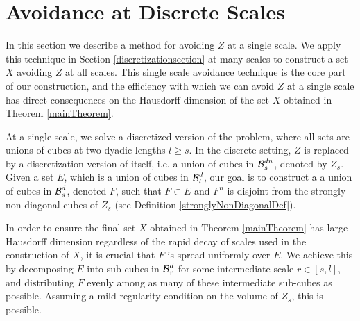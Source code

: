 \section{Avoidance at Discrete Scales}\label{discretesection}

In this section we describe a method for avoiding $Z$ at a single scale. We apply this technique in Section \ref{discretizationsection} at many scales to construct a set $X$ avoiding $Z$ at all scales. This single scale avoidance technique is the core part of our construction, and the efficiency with which we can avoid $Z$ at a single scale has direct consequences on the Hausdorff dimension of the set $X$ obtained in Theorem \ref{mainTheorem}.

At a single scale, we solve a discretized version of the problem, where all sets are unions of cubes at two dyadic lengths $l \geq s$. In the discrete setting, $Z$ is replaced by a discretization version of itself, i.e. a union of cubes in $\operatorname{\mathcal{B}}^{dn}_s$, denoted by $Z_s$. Given a set $E$, which is a union of cubes in $\operatorname{\mathcal{B}}_l^d$, our goal is to construct a a union of cubes in $\operatorname{\mathcal{B}}_s^d$, denoted $F$, such that $F \subset E$ and $F^n$ is disjoint from the strongly non-diagonal cubes of $Z_s$ (see Definition \ref{stronglyNonDiagonalDef}).


In order to ensure the final set $X$ obtained in Theorem \ref{mainTheorem} has large Hausdorff dimension regardless of the rapid decay of scales used in the construction of $X$, it is crucial that $F$ is spread uniformly over $E$. We achieve this by decomposing $E$ into sub-cubes in $\operatorname{\mathcal{B}}_r^d$ for some intermediate scale $r \in [s,l]$, and distributing $F$ evenly among as many of these intermediate sub-cubes as possible. Assuming a mild regularity condition on the volume of $Z_s$, this is possible.

